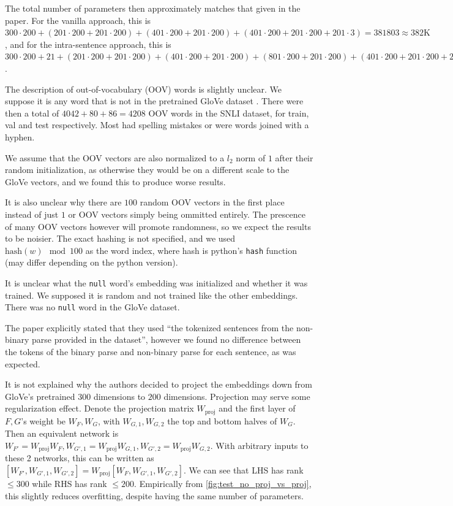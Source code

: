 \documentclass{article}
\begin{document}
The total number of parameters then approximately matches that given in the paper. For the vanilla approach, this is $300 \cdot 200 + (201 \cdot 200 + 201 \cdot 200) + (401 \cdot 200 + 201 \cdot 200) + (401 \cdot 200 + 201 \cdot 200 + 201 \cdot 3) = 381803 \approx 382\text{K}$, and for the intra-sentence approach, this is $300 \cdot 200 + 21 + (201 \cdot 200 + 201 \cdot 200) + (401 \cdot 200 + 201 \cdot 200) + (801 \cdot 200 + 201 \cdot 200) + (401 \cdot 200 + 201 \cdot 200 + 201 \cdot 3) = 582224 \approx 582\text{K}$.

The description of out-of-vocabulary (OOV) words is slightly unclear. We suppose it is any word that is not in the pretrained GloVe dataset \citep{pennington2014glove}. There were then a total of $4042 + 80 + 86 = 4208$ OOV words in the SNLI dataset, for train, val and test respectively. Most had spelling mistakes or were words joined with a hyphen.

We assume that the OOV vectors are also normalized to a $l_2$ norm of $1$ after their random initialization, as otherwise they would be on a different scale to the GloVe vectors, and we found this to produce worse results.

It is also unclear why there are $100$ random OOV vectors in the first place instead of just $1$ or OOV vectors simply being ommitted entirely. The prescence of many OOV vectors however will promote randomness, so we expect the results to be noisier. The exact hashing is not specified, and we used $\text{hash}(w) \mod 100$ as the word index, where hash is python's \texttt{hash} function (may differ depending on the python version).

It is unclear what the \texttt{null} word's embedding was initialized and whether it was trained. We supposed it is random and not trained like the other embeddings. There was no \texttt{null} word in the GloVe dataset.

The paper explicitly stated that they used ``the tokenized sentences from the non-binary parse provided in the dataset'', however we found no difference between the tokens of the binary parse and non-binary parse for each sentence, as was expected.

It is not explained why the authors decided to project the embeddings down from GloVe's pretrained $300$ dimensions to $200$ dimensions. Projection may serve some regularization effect. Denote the projection matrix $W_\text{proj}$ and the first layer of $F, G$'s weight be $W_F, W_G$, with $W_{G,1}, W_{G,2}$ the top and bottom halves of $W_G$. Then an equivalent network is $W_{F'} = W_\text{proj} W_F, W_{G',1} = W_\text{proj} W_{G,1}, W_{G',2} = W_\text{proj} W_{G,2}$. With arbitrary inputs to these 2 networks, this can be written as $[W_{F'}, W_{G',1}, W_{G',2}] = W_\text{proj} [W_F, W_{G',1}, W_{G',2}]$. We can see that LHS has rank $\le 300$ while RHS has rank $\le 200$. Empirically from \autoref{fig:test_no_proj_vs_proj}, this slightly reduces overfitting, despite having the same number of parameters.
\end{document}
